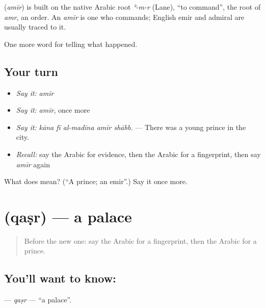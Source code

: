 \begin{cousinweb}
\textbf{} (\emph{amīr}) is built on the native Arabic root \emph{ʾ-m-r} (Lane), \textquotedblleft{}to command\textquotedblright{}, the root of \emph{amr}, an order. An \emph{amīr} is one who commands; English emir and admiral are usually traced to it.
\end{cousinweb}

\begin{grammarlens}[title={What you've built}]
One more word for telling what happened.
\end{grammarlens}

\subsection*{Your turn}
\begin{itemize}
\raggedright
  \item \emph{Say it:} \emph{amīr}
  \item \emph{Say it:} \emph{amīr}, once more
  \item \emph{Say it:} \emph{kāna fī al-madīna amīr shābb.} — There was a young prince in the city.
  \item \emph{Recall:} say the Arabic for evidence, then the Arabic for a fingerprint, then say \emph{amīr} again
\end{itemize}

\begin{tcolorbox}[breakable,colback=teal!4,colframe=teal!35!black,title={Before you move on}]
What does  mean? (\textquotedblleft{}A prince; an emir\textquotedblright{}.) Say it once more.
\end{tcolorbox}
\section[\texorpdfstring{\ar{قصر} (qaṣr)}{قصر (qaṣr)}]{ (qaṣr) — a palace}

\label{lesson:AR-C309-qasr}



\begin{quote}
Before the new one: say the Arabic for a fingerprint, then the Arabic for a prince.
\end{quote}

\subsection*{You'll want to know: }
\textbf{} — \emph{qaṣr} — \textquotedblleft{}a palace\textquotedblright{}.

